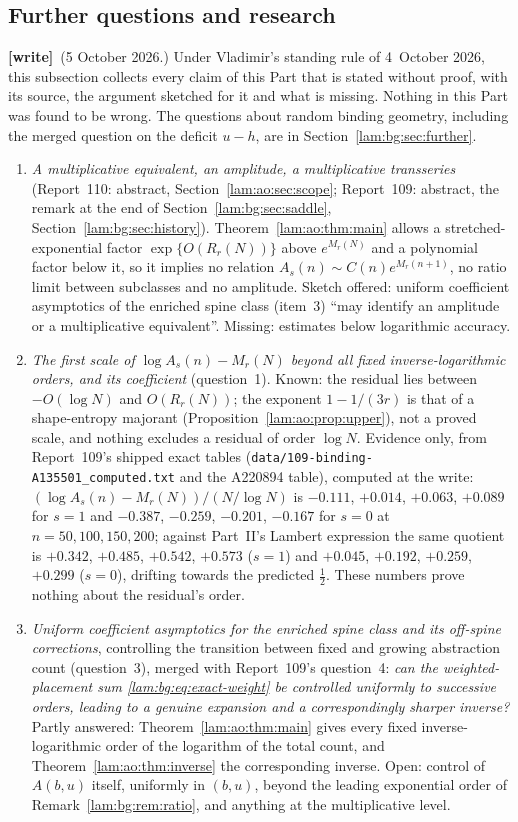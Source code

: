 \documentclass[11pt,a4paper]{article}
\numberwithin{equation}{section}
\theoremstyle{remark}
\newcommand{\file}[1]{\nolinkurl{#1}}
\newcommand{\wtag}{\textup{\textbf{[write]}}}
\begin{document}
\subsection{Further questions and research}\label{lam:ao:sub:further}
\wtag\ (5 October 2026.) Under Vladimir's standing rule of 4~October 2026, this subsection collects every claim of this Part that is stated without proof, with its source, the argument sketched for it and what is missing. Nothing in this Part was found to be wrong. The questions about random binding geometry, including the merged question on the deficit $u-h$, are in Section~\ref{lam:bg:sec:further}.
\begin{enumerate}
\item \emph{A multiplicative equivalent, an amplitude, a multiplicative transseries} (Report~110: abstract, Section~\ref{lam:ao:sec:scope}; Report~109: abstract, the remark at the end of Section~\ref{lam:bg:sec:saddle}, Section~\ref{lam:bg:sec:history}). Theorem~\ref{lam:ao:thm:main} allows a stretched-exponential factor $\exp\{O(R_r(N))\}$ above $e^{M_r(N)}$ and a polynomial factor below it, so it implies no relation $A_s(n)\sim C(n)e^{M_r(n+1)}$, no ratio limit between subclasses and no amplitude. Sketch offered: uniform coefficient asymptotics of the enriched spine class (item~3) ``may identify an amplitude or a multiplicative equivalent''. Missing: estimates below logarithmic accuracy.
\item \emph{The first scale of $\log A_s(n)-M_r(N)$ beyond all fixed inverse-logarithmic orders, and its coefficient} (question~1). Known: the residual lies between $-O(\log N)$ and $O(R_r(N))$; the exponent $1-1/(3r)$ is that of a shape-entropy majorant (Proposition~\ref{lam:ao:prop:upper}), not a proved scale, and nothing excludes a residual of order $\log N$. Evidence only, from Report~109's shipped exact tables (\file{data/109-binding-A135501_computed.txt} and the A220894 table), computed at the write: $(\log A_s(n)-M_r(N))/(N/\log N)$ is $-0.111$, $+0.014$, $+0.063$, $+0.089$ for $s=1$ and $-0.387$, $-0.259$, $-0.201$, $-0.167$ for $s=0$ at $n=50,100,150,200$; against Part~II's Lambert expression the same quotient is $+0.342$, $+0.485$, $+0.542$, $+0.573$ ($s=1$) and $+0.045$, $+0.192$, $+0.259$, $+0.299$ ($s=0$), drifting towards the predicted $\frac12$. These numbers prove nothing about the residual's order.
\item \emph{Uniform coefficient asymptotics for the enriched spine class and its off-spine corrections}, controlling the transition between fixed and growing abstraction count (question~3), merged with Report~109's question~4: \emph{can the weighted-placement sum \eqref{lam:bg:eq:exact-weight} be controlled uniformly to successive orders, leading to a genuine expansion and a correspondingly sharper inverse?} Partly answered: Theorem~\ref{lam:ao:thm:main} gives every fixed inverse-logarithmic order of the logarithm of the total count, and Theorem~\ref{lam:ao:thm:inverse} the corresponding inverse. Open: control of $A(b,u)$ itself, uniformly in $(b,u)$, beyond the leading exponential order of Remark~\ref{lam:bg:rem:ratio}, and anything at the multiplicative level.

\end{enumerate}
\end{document}
